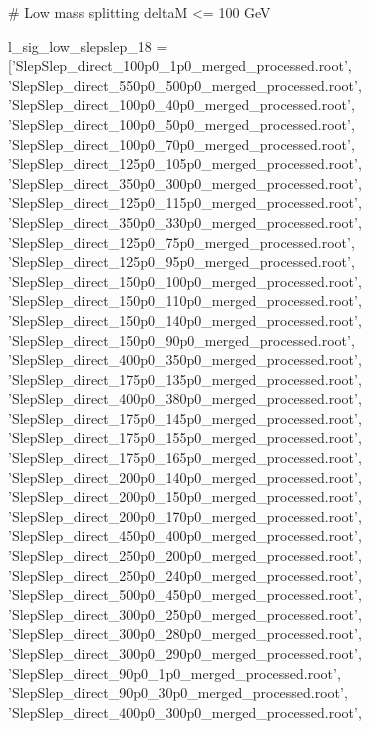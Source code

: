 # Low mass splitting deltaM <= 100 GeV

l_sig_low_slepslep_18 = ['SlepSlep_direct_100p0_1p0_merged_processed.root',
                      'SlepSlep_direct_550p0_500p0_merged_processed.root',
                      'SlepSlep_direct_100p0_40p0_merged_processed.root',
                      'SlepSlep_direct_100p0_50p0_merged_processed.root',
                      'SlepSlep_direct_100p0_70p0_merged_processed.root',
                      'SlepSlep_direct_125p0_105p0_merged_processed.root',
                      'SlepSlep_direct_350p0_300p0_merged_processed.root',
                      'SlepSlep_direct_125p0_115p0_merged_processed.root',
                      'SlepSlep_direct_350p0_330p0_merged_processed.root',
                      'SlepSlep_direct_125p0_75p0_merged_processed.root',
                      'SlepSlep_direct_125p0_95p0_merged_processed.root',
                      'SlepSlep_direct_150p0_100p0_merged_processed.root',
                      'SlepSlep_direct_150p0_110p0_merged_processed.root',
                      'SlepSlep_direct_150p0_140p0_merged_processed.root',
                      'SlepSlep_direct_150p0_90p0_merged_processed.root',
                      'SlepSlep_direct_400p0_350p0_merged_processed.root',
                      'SlepSlep_direct_175p0_135p0_merged_processed.root',
                      'SlepSlep_direct_400p0_380p0_merged_processed.root',
                      'SlepSlep_direct_175p0_145p0_merged_processed.root',
                      'SlepSlep_direct_175p0_155p0_merged_processed.root',
                      'SlepSlep_direct_175p0_165p0_merged_processed.root',
                      'SlepSlep_direct_200p0_140p0_merged_processed.root',
                      'SlepSlep_direct_200p0_150p0_merged_processed.root',
                      'SlepSlep_direct_200p0_170p0_merged_processed.root',
                      'SlepSlep_direct_450p0_400p0_merged_processed.root',
                      'SlepSlep_direct_250p0_200p0_merged_processed.root',
                      'SlepSlep_direct_250p0_240p0_merged_processed.root',
                      'SlepSlep_direct_500p0_450p0_merged_processed.root',
                      'SlepSlep_direct_300p0_250p0_merged_processed.root',
                      'SlepSlep_direct_300p0_280p0_merged_processed.root',
                      'SlepSlep_direct_300p0_290p0_merged_processed.root',
                      'SlepSlep_direct_90p0_1p0_merged_processed.root',
                      'SlepSlep_direct_90p0_30p0_merged_processed.root',
                      'SlepSlep_direct_400p0_300p0_merged_processed.root',
